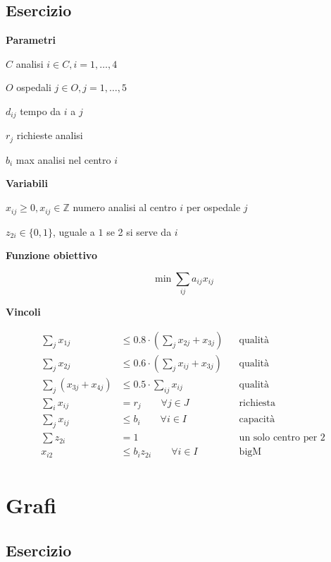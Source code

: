 \documentclass[10pt,a4paper,twoside,openright]{book}
\newcounter{es}
\newcommand{\Es}{
	\stepcounter{es}
	\section{Esercizio \arabic{es}}
	}
\numberwithin{es}{chapter}
\newcommand{\Par}{\textbf{Parametri}}
\newcommand{\Var}{\textbf{Variabili}}
\newcommand{\Fob}{\textbf{Funzione obiettivo}}
\newcommand{\Vin}{\textbf{Vincoli}}
\begin{document}
\Es

\Par

$C$ analisi $i\in C,i=1,\dotsc ,4$

$O$ ospedali $j\in O,j=1,\dotsc ,5$

$d_{ij}$ tempo da $i$ a $j$

$r_{j}$ richieste analisi

$b_{i}$ max analisi nel centro $i$

\Var

$x_{ij} \geq 0,x_{ij} \in \mathbb{Z}$ numero analisi al centro $i$ per ospedale $j$

$z_{2i} \in \{0,1\}$, uguale a $1$ se 2 si serve da $i$

\Fob

\begin{equation*}
	\min\sum _{ij} a_{ij} x_{ij}
\end{equation*}

\Vin

\begin{align*}
	\sum _{j} x_{1j} &\leq 0.8\cdot \left(\sum _{j} x_{2j} +x_{3j}\right) && \text{qualità} \\
	\sum _{j} x_{2j} &\leq 0.6\cdot \left(\sum _{j} x_{ij} +x_{3j}\right) && \text{qualità} \\
	\sum _{j}( x_{3j} +x_{4j}) &\leq 0.5\cdot \sum _{ij} x_{ij} && \text{qualità} \\
	\sum _{i} x_{ij} &=r_{j} \qquad\forall j\in J && \text{richiesta} \\
	\sum _{j} x_{ij} &\leq b_{i} \qquad\forall i\in I && \text{capacità} \\
	\sum z_{2i} &=1 && \text{un solo centro per 2} \\
	x_{i2} &\leq b_{i} z_{2i} \qquad\forall i\in I && \text{bigM} \\
\end{align*}



\chapter{Grafi}

\Es
\end{document}
